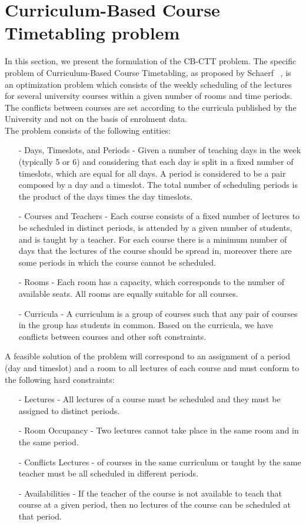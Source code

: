 \section{Curriculum-Based Course Timetabling problem}
\label{cbcttproblem}
\thispagestyle{plain}
In this section, we present the formulation of the CB-CTT problem.
The specific problem of Curriculum-Based Course Timetabling, as proposed by Schaerf ~\cite{McCollum}, is an optimization problem which consists of the weekly scheduling of the lectures for several university courses within a given number of rooms and time periods. The conflicts between courses are set according to the curricula published by the University and not on the basis of enrolment data.\\
The problem consists of the following entities:
\begin{itemize}
\item[-] Days, Timeslots, and Periods - Given a number of teaching days in the week (typically 5 or 6) and considering that each day is split in a fixed number of timeslots, which are equal for all days. A period is considered to be a pair composed by a day and a timeslot. The total number of scheduling periods is the product of the days times the day timeslots. 
\item[-] Courses and Teachers - Each course consists of a fixed number of lectures to be scheduled in distinct periods, is attended by a given number of students, and is taught by a teacher. For each course there is a minimum number of days that the lectures of the course should be spread in, moreover there are some periods in which the course cannot be scheduled.
\item[-] Rooms - Each room has a capacity, which corresponds to the number of available seats. All rooms are equally suitable for all courses.
\item[-] Curricula - A curriculum is a group of courses such that any pair of courses in the group has students in common. Based on the curricula, we have conflicts between courses and other soft constraints. 
\end{itemize}
A feasible solution of the problem will correspond to an assignment of a period (day and timeslot) and a room to all lectures of each course and must conform to the following hard constraints:
\begin{itemize}
\item[-] Lectures - All lectures of a course must be scheduled and they must be assigned to distinct periods. 
\item[-] Room Occupancy - Two lectures cannot take place in the same room and in the same period. 
\item[-] Conflicts Lectures - of courses in the same curriculum or taught by the same teacher must be all scheduled in different periods.
\item[-] Availabilities - If the teacher of the course is not available to teach that course at a given period, then no lectures of the course can be scheduled at that period.
\end{itemize}
